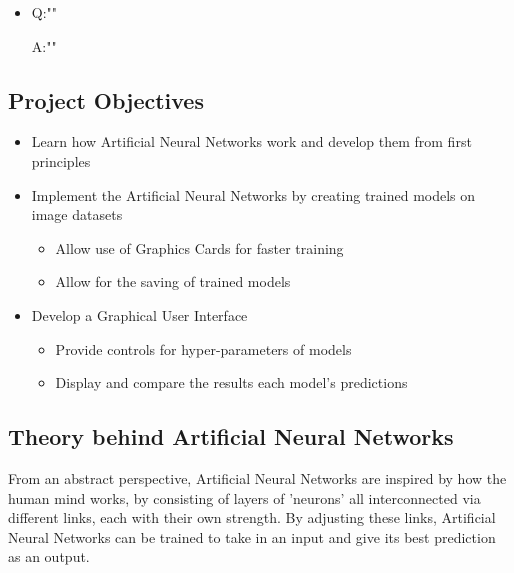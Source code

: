 \documentclass[./project-report/src/latex/project-report.tex]{subfiles}
\begin{document}

\begin{itemize}
    \item Q:""

          A:""
\end{itemize}

\subsection{Project Objectives}

\begin{itemize}
    \item Learn how Artificial Neural Networks work and develop them from first principles
    \item Implement the Artificial Neural Networks by creating trained models on image datasets
    \begin{itemize}
        \item Allow use of Graphics Cards for faster training
        \item Allow for the saving of trained models
    \end{itemize}
    \item Develop a Graphical User Interface
    \begin{itemize}
        \item Provide controls for hyper-parameters of models
        \item Display and compare the results each model's predictions
    \end{itemize}
\end{itemize}

\subsection{Theory behind Artificial Neural Networks}

From an abstract perspective, Artificial Neural Networks are inspired by how the human mind works, by consisting of layers of 'neurons' all interconnected via 
different links, each with their own strength. By adjusting these links, Artificial Neural Networks can be trained to take in an input and give its best 
prediction as an output.
\vspace{5mm}
\end{document}
